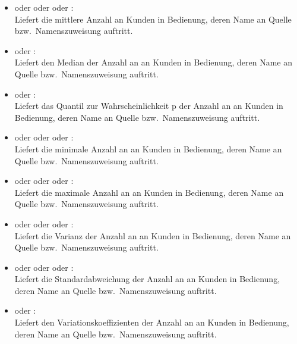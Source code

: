 \begin{itemize}    
 
\item
{} oder  oder  oder :\\
Liefert die mittlere Anzahl an Kunden in Bedienung, deren Name an Quelle bzw.\ Namenszuweisung  auftritt.

\item
{} oder :\\
Liefert den Median der Anzahl an an Kunden in Bedienung, deren Name an Quelle bzw.\ Namenszuweisung  auftritt.

\item
{} oder :\\
Liefert das Quantil zur Wahrscheinlichkeit p der Anzahl an an Kunden in Bedienung, deren Name an Quelle bzw.\ Namenszuweisung  auftritt.

\item
{} oder  oder  oder :\\
Liefert die minimale Anzahl an an Kunden in Bedienung, deren Name an Quelle bzw.\ Namenszuweisung  auftritt.

\item
{} oder  oder  oder :\\
Liefert die maximale Anzahl an an Kunden in Bedienung, deren Name an Quelle bzw.\ Namenszuweisung  auftritt.

\item
{} oder  oder  oder :\\
Liefert die Varianz der Anzahl an an Kunden in Bedienung, deren Name an Quelle bzw.\ Namenszuweisung  auftritt.

\item
{} oder  oder  oder :\\
Liefert die Standardabweichung der Anzahl an an Kunden in Bedienung, deren Name an Quelle bzw.\ Namenszuweisung  auftritt.

\item
{} oder :\\
Liefert den Variationskoeffizienten der Anzahl an an Kunden in Bedienung, deren Name an Quelle bzw.\ Namenszuweisung  auftritt.


\end{itemize}

